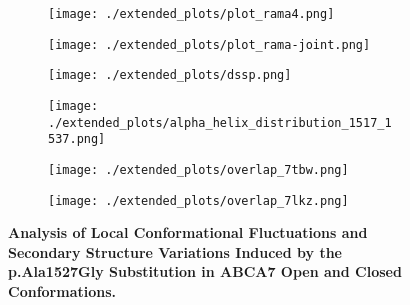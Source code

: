 \begin{figure}[H]
    \begin{subfigure}[t]{.6\textwidth}
        \caption{}
        \texttt{[image: ./extended\_plots/plot\_rama4.png]}        
    \end{subfigure}
    \begin{subfigure}[t]{.4\textwidth}
        \caption{}
        \texttt{[image: ./extended\_plots/plot\_rama-joint.png]}        
    \end{subfigure}
    \begin{subfigure}[t]{.5\textwidth}
        \caption{}
        \texttt{[image: ./extended\_plots/dssp.png]}        
    \end{subfigure}
    \begin{subfigure}[t]{.45\textwidth}
        \caption{}
        \texttt{[image: ./extended\_plots/alpha\_helix\_distribution\_1517\_1537.png]}        
    \end{subfigure}
    \begin{subfigure}[t]{.45\textwidth}
        \caption{}
        \texttt{[image: ./extended\_plots/overlap\_7tbw.png]}        
    \end{subfigure}
    \begin{subfigure}[t]{.45\textwidth}
        \caption{}
        \texttt{[image: ./extended\_plots/overlap\_7lkz.png]}        
    \end{subfigure}
    \caption{
        \textbf{Analysis of Local Conformational Fluctuations and Secondary Structure Variations Induced by the p.Ala1527Gly Substitution in ABCA7 Open and Closed Conformations.}\\
        }
        \label{fig:md_simulations_2}
    \end{figure}
